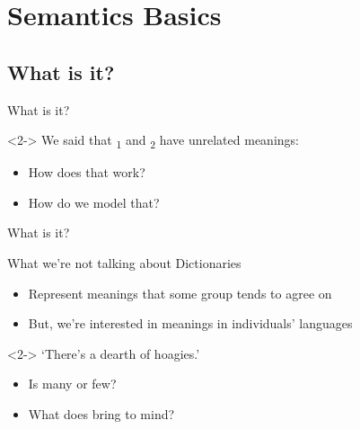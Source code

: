 \documentclass{beamer}
\subtitle[Intro to Semantics]{Introduction to Semantics}
\newcommand{\suboneone}{What is it?}
\begin{document}
  

  \section{Semantics Basics}
    \subsection{\suboneone}
      \begin{frame}{\suboneone}
        \begin{definition}
          
        \end{definition}
        \begin{example}<2->
          We said that \textsubscript{1} and \textsubscript{2} have unrelated meanings:
          \begin{itemize}
            \item How does that work?
            \item How do we model that?
          \end{itemize}
        \end{example}
      \end{frame}

      \begin{frame}{\suboneone}
        \begin{block}{What we're not talking about}
          Dictionaries
          \begin{itemize}
            \item Represent meanings that some group tends to agree on
            \item But, we're interested in meanings in individuals' languages
          \end{itemize}
        \end{block}
        \begin{example}<2->
          `There's a dearth of hoagies.'
          \begin{itemize}
            \item Is  many or few?
            \item What does  bring to mind?
          \end{itemize}
        \end{example}
      \end{frame}
\end{document}

